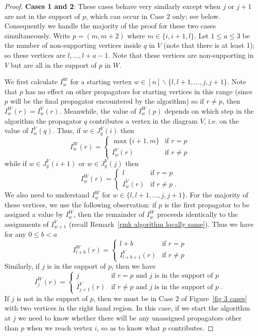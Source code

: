 \documentclass[11pt]{article}
\theoremstyle{remark}
\theoremstyle{definition}
\begin{document}
\begin{proof}

\textbf{Cases 1 and 2}: These cases behave very similarly except when $j$ or $j+1$ are not in the support of $p$, which can occur in Case 2 only; see below. Consequently we handle the majority of the proof for these two cases simultaneously. Write $p=(m,m+2)$ where $m\in \{i, i+1, l\}$. Let $1\leq a\leq 3$ be the number of non-supporting vertices inside $q$ in $V$ (note that there is at least 1); so these vertices are $l, \ldots, l+a-1$.  Note that these vertices are non-supporting in $V$ but are all in the support of $p$ in $W$. 

We first calculate $I^{W}_w$ for a starting vertex ${w \in [n]\backslash \{l, l+1, \ldots,j,j+1\}}$. Note that $p$ has no effect on other propagators for starting vertices in this range (since $p$ will be the final propagator encountered by the algorithm) so if $r \neq p$, then $I_w^W(r) = I_w^V(r)$. Meanwhile, the value of $I^{W}_w(p)$ depends on which step in the algorithm the propagator $q$ contributes a vertex in the diagram $V$, i.e. on the value of $I^{V}_w(q)$. Thus, if $w\in J_q^{V}(i)$ then 
    \[
    I_w^{W}(r) =  \begin{cases}
        \max\{i+1, m\} & \text{if } r=p \\
        I_{w}^{V}(r) & \text{if } r\neq p
      \end{cases} 
    \]
    while if $w\in J_q^{V}(i+1)$ or $w\in J_q^{V}(j)$ then
    \[
    I_w^{W}(r) =  \begin{cases}
        l & \text{if } r=p \\
        I_{w}^{V}(r) & \text{if } r\neq p \;.
      \end{cases} 
      \]
We also need to understand $I^{W}_w$ for $w \in \{l,l+1,\ldots,j,j+1\}$. For the majority 
of these vertices, we use the following observation: if $p$ is the first propagator to be assigned a value by $I_w^{W}$, then the remainder of $I_w^{W}$ proceeds identically to the assignments of $I^{V}_{w+1}$ (recall Remark~\ref{rmk algorithm locally same}).  Thus we have for any $0\leq b <a$
    \[
    I_{l+b}^{W}(r) = \begin{cases}
      l+b & \text{if } r=p\\
      I_{l+b+1}^{V}(r) & \text{if } r\neq p
    \end{cases}
    \]
Similarly, if $j$ is in the support of $p$, then we have
     \[
       I_j^{W}(r) = \begin{cases}
         j & \text{if $r=p$ and $j$ is in the support of $p$}\\
         I_{j+1}^{V}(r) & \text{if $r\neq p$ and $j$ is in the support of $p$} \;.
       \end{cases} 
       \]
If $j$ is not in the support of $p$, then we must be in Case 2 of Figure~\ref{fig 3 cases} with two vertices in the right hand region.  In this case, if we start the algorithm at $j$ we need to know whether there will be any unassigned propagators other than $p$ when we reach vertex $i$, so as to know what $p$ contributes.


\end{proof}
\end{document}
